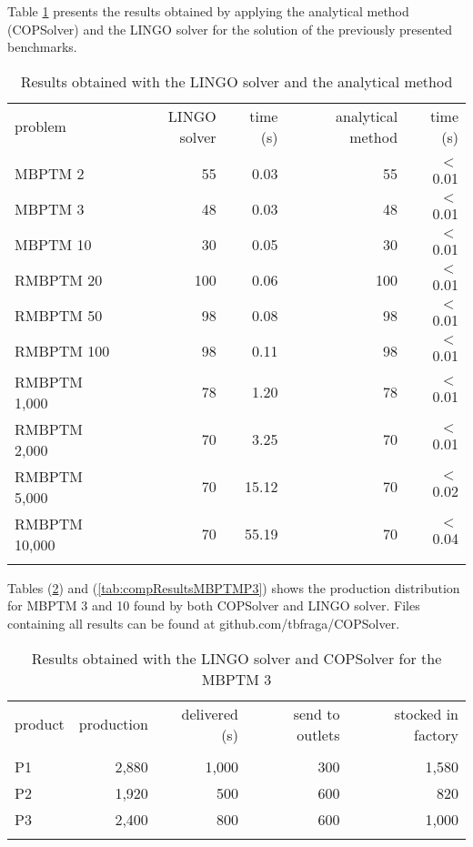 \documentclass[authoryear,manuscript,12pt]{elsarticle}
\begin{document}
Table \ref{tab:results} presents the results obtained by applying the analytical method (COPSolver) and the LINGO solver for the solution of the previously presented benchmarks.

\begin{table}[h]
\begin{center}
\begin{footnotesize}
\begin{tabular}[c]{l r r r r}
problem & LINGO solver & time (s) & analytical method & time (s) \\
\cline {1-5} \\
MBPTM 2 & 55 & 0.03 & 55 & $<$ 0.01 \\
MBPTM 3 & 48 & 0.03 & 48 & $<$ 0.01 \\
MBPTM 10 & 30 & 0.05 & 30 & $<$ 0.01 \\
RMBPTM 20 & 100 & 0.06 & 100 & $<$ 0.01 \\
RMBPTM 50 & 98 & 0.08 & 98 & $<$ 0.01 \\
RMBPTM 100 & 98 & 0.11 & 98 & $<$ 0.01 \\
RMBPTM 1,000 & 78 & 1.20 & 78 & $<$ 0.01 \\
RMBPTM 2,000 & 70 & 3.25 & 70 & $<$ 0.01 \\
RMBPTM 5,000 & 70 & 15.12 & 70 & $<$ 0.02 \\
RMBPTM 10,000 & 70 & 55.19 & 70 & $<$ 0.04 \\
\cline {1-5} \\
\end{tabular}
\caption{Results obtained with the LINGO solver and the analytical method}
\label{tab:results}
\end{footnotesize}
\end{center}
\end{table}

Tables (\ref{tab:compResultsMBPTMP2}) and (\ref{tab:compResultsMBPTMP3}) shows the production distribution for MBPTM 3 and 10 found by both COPSolver and LINGO solver. Files containing all results can be found at github.com/tbfraga/COPSolver.

\begin{table}[h]
\begin{center}
\begin{footnotesize}
\begin{tabular}[c]{l r r r r}
product & production & delivered (s) & send to outlets & stocked in factory \\
\cline {1-5} \\
P1 & 2,880 & 1,000 & 300 & 1,580 \\
P2 & 1,920 & 500 & 600 & 820 \\
P3 & 2,400 & 800 & 600 & 1,000 \\
\cline {1-5} \\
\end{tabular}
\caption{Results obtained with the LINGO solver and COPSolver for the MBPTM 3}
\label{tab:compResultsMBPTMP2}
\end{footnotesize}
\end{center}
\end{table}
\end{document}
